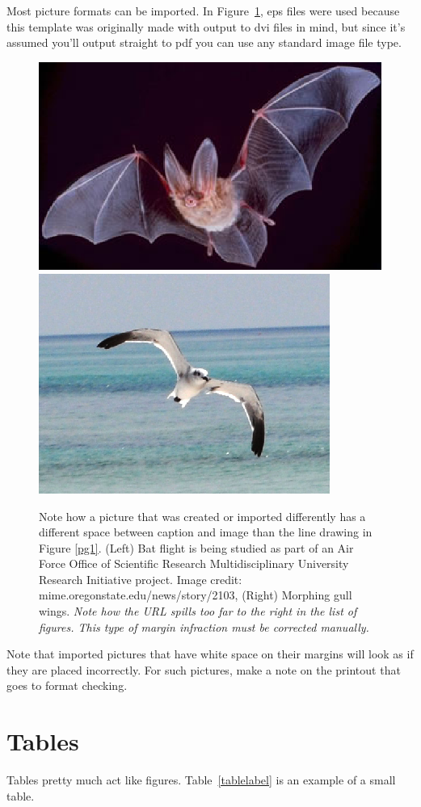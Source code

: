 Most picture formats can be imported. In Figure~\ref{batgull2},
eps files were used because this template was originally made with
output to dvi files in mind, but since it's assumed you'll output
straight to pdf you can use any standard image file type.

\begin{figure}[hbt] %
	\centering
	\includegraphics[width=.45\linewidth]{figs/bat_b.eps}\hspace*{0.04in}
	\includegraphics[width=.36\linewidth]{figs/gull2_b.eps}\\
	\caption{
	Note how a picture that was created or imported differently has a different
	space between caption and image than the line drawing in Figure
	\protect\ref{pg1}. (Left) Bat flight is being studied as part of an
	Air Force Office of Scientific Research Multidisciplinary
	University Research Initiative project.
	Image credit: mime.oregonstate.edu/news/story/2103, (Right)
	Morphing gull wings.
	{\em Note how the URL spills too far to the right in the
	list of figures. This type of margin infraction must be
	corrected manually.}}
	\label{batgull2}
\end{figure}

Note that imported pictures that have white space on their margins
will look as if they are placed incorrectly. For such pictures,
make a note on the printout that goes to format checking.


\newpage
\section{Tables}

Tables pretty much act like figures. Table~\ref{tablelabel}
is an example of a small table.


